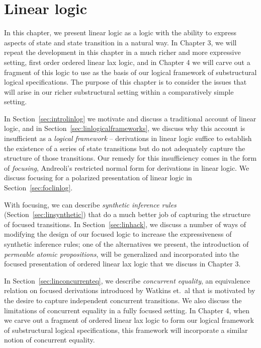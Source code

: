 
\chapter{Linear logic}

In this chapter, we present linear logic as a logic with the ability
to express aspects of state and state transition in a natural way.  In
Chapter 3, we will repeat the development in this chapter in a much
richer and more expressive setting, first order ordered linear lax
logic, and in Chapter 4 we will carve out a fragment of this logic to
use as the basis of our logical framework of substructural logical
specifications. The purpose of this chapter is to consider the issues
that will arise in our richer substructural setting within a
comparatively simple setting.

In Section~\ref{sec:introlinlog} we motivate and discuss a traditional
account of linear logic, and in
Section~\ref{sec:linlogicalframeworks}, we discuss why this account is
insufficient as a {\it logical framework} -- derivations in linear
logic suffice to establish the existence of a series of state
transitions but do not adequately capture the structure of those
transitions. Our remedy for this insufficiency comes in the form of
{\it focusing}, Andreoli's restricted normal form for derivations in
linear logic. We discuss focusing for a polarized presentation of
linear logic in Section~\ref{sec:foclinlog}.

With focusing, we can describe {\it synthetic inference rules}
(Section~\ref{sec:linsynthetic}) that do a much better job of
capturing the structure of focused transitions. In
Section~\ref{sec:linhack}, we discuss a number of ways of modifying
the design of our focused logic to increase the expressiveness of
synthetic inference rules; one of the alternatives we present, the
introduction of {\it permeable atomic propositions}, will be
generalized and incorporated into the focused presentation of ordered
linear lax logic that we discuss in Chapter 3.

In Section~\ref{sec:linconcurrenteq}, we describe {\it concurrent
  equality}, an equivalence relation on focused derivations introduced
by Watkins et.~al that is motivated by the desire to capture
independent concurrent transitions. We also discuss the limitations of
concurrent equality in a fully focused setting.  In Chapter 4, when we
carve out a fragment of ordered linear lax logic to form our logical
framework of substructural logical specifications, this framework will
incorporate a similar notion of concurrent equality.


